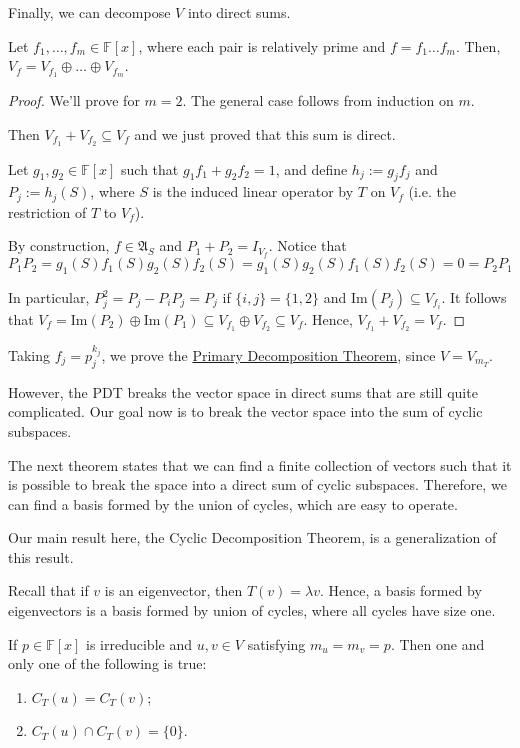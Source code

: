 Finally, we can decompose $V$ into direct sums.

\begin{theorem}
	Let $f_1, \ldots, f_m \in \mathbb{F}[x]$, where each pair is relatively prime and $f = f_1 \ldots f_m$. Then, $V_f = V_{f_1} \oplus \ldots \oplus V_{f_m}$.
\end{theorem}

\begin{proof}
	We'll prove for $m = 2$. The general case follows from induction on $m$.

	Then $V_{f_1} + V_{f_2} \subseteq V_f$ and we just proved that this sum is direct.

	Let $g_1, g_2 \in \mathbb{F}[x]$ such that $g_1 f_1 + g_2 f_2 = 1$, and define $h_j := g_j f_j$ and $P_j := h_j(S)$, where $S$ is the induced linear operator by $T$ on $V_f$ (i.e. the restriction of $T$ to $V_f$). 

	By construction, $f \in \mathfrak{A}_S$ and $P_1 + P_2 = I_{V_f}$. Notice that
	\[
		P_1 P_2 = g_1(S)f_1(S)g_2(S)f_2(S) = g_1(S)g_2(S)f_1(S)f_2(S) = 0 = P_2 P_1
	\]

	In particular, $P_j^2 = P_j - P_i P_j = P_j$ if $\{ i, j \} = \{ 1, 2 \}$ and $\text{Im}(P_j) \subseteq V_{f_i}$. It follows that $V_f = \text{Im}(P_2) \oplus \text{Im}(P_1) \subseteq V_{f_1} \oplus V_{f_2} \subseteq V_f$. Hence, $V_{f_1} + V_{f_2} = V_f$.
\end{proof}

Taking $f_j = p_j^{k_j}$, we prove the \hyperref[thm:pdt]{Primary Decomposition Theorem}, since $V = V_{m_T}$.

However, the PDT breaks the vector space in direct sums that are still quite complicated. Our goal now is to break the vector space into the sum of cyclic subspaces. 

The next theorem states that we can find a finite collection of vectors such that it is possible to break the space into a direct sum of cyclic subspaces. Therefore, we can find a basis formed by the union of cycles, which are easy to operate.

Our main result here, the Cyclic Decomposition Theorem, is a generalization of this result.

Recall that if $v$ is an eigenvector, then $T(v) = \lambda v$. Hence, a basis formed by eigenvectors is a basis formed by union of cycles, where all cycles have size one. 

\begin{lemma}\label{lemma:202210200909}
	If $p \in \mathbb{F}[x]$ is irreducible and $u, v \in V$ satisfying $m_u = m_v = p$. Then one and only one of the following is true:
	\begin{enumerate}
		\item $C_T(u) = C_T(v)$;
		\item $C_T(u) \cap C_T(v) = \{ 0 \}$.
	\end{enumerate}
\end{lemma}

